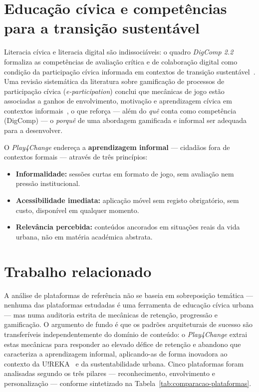 \section{Educação cívica e competências para a transição sustentável}
\label{sec:educacao-civica}

Literacia cívica e literacia digital são indissociáveis: o quadro \emph{DigComp 2.2}~\cite{vuorikari2022digcomp} formaliza as competências de avaliação crítica e de colaboração digital como condição da participação cívica informada em contextos de transição sustentável~\citep{ureka2026alliance}. Uma revisão sistemática da literatura sobre gamificação de processos de participação cívica (\emph{e-participation}) conclui que mecânicas de jogo estão associadas a ganhos de envolvimento, motivação e aprendizagem cívica em contextos informais~\cite{hassan2020gameful}, o que reforça --- além do \emph{quê} conta como competência (DigComp) --- o \emph{porquê} de uma abordagem gamificada e informal ser adequada para a desenvolver.

O \emph{Play4Change} endereça a \textbf{aprendizagem informal} --- cidadãos fora de contextos formais --- através de três princípios:

\begin{itemize}
    \item \textbf{Informalidade:} sessões curtas em formato de jogo, sem avaliação nem pressão institucional.
    \item \textbf{Acessibilidade imediata:} aplicação móvel sem registo obrigatório, sem custo, disponível em qualquer momento.
    \item \textbf{Relevância percebida:} conteúdos ancorados em situações reais da vida urbana, não em matéria académica abstrata.
\end{itemize}

\section{Trabalho relacionado}
\label{sec:trabalho-relacionado}

A análise de plataformas de referência não se baseia em sobreposição temática --- nenhuma das plataformas estudadas é uma ferramenta de educação cívica urbana --- mas numa auditoria estrita de mecânicas de retenção, progressão e gamificação. O argumento de fundo é que os padrões arquiteturais de sucesso são transferíveis independentemente do domínio de conteúdo: o \emph{Play4Change} extrai estas mecânicas para responder ao elevado défice de retenção e abandono que caracteriza a aprendizagem informal, aplicando-as de forma inovadora ao contexto da U!REKA~\citep{ureka2026alliance} e da sustentabilidade urbana. Cinco plataformas foram analisadas segundo os três pilares --- reconhecimento, envolvimento e personalização --- conforme sintetizado na Tabela~\ref{tab:comparacao-plataformas}.

